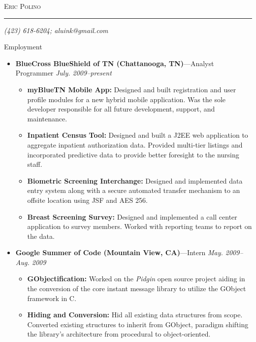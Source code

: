 \documentclass[11pt,oneside]{article}
\makeatletter
\newcommand{\name}{Eric Polino}
\newcommand{\phone}{(423) 618-6204}
\newcommand{\email}{aluink@gmail.com}
\newcommand{\bigname}[1]{
	\begin{center}\fontfamily{phv}\selectfont\Huge\scshape#1\end{center}
}
\newenvironment{ressection}[1]{
	\vspace{4pt}
	{\fontfamily{phv}\selectfont\Large#1}
	\begin{itemize}
	\vspace{3pt}
}{
	\end{itemize}
}
\newcommand{\ressubitem}[1]{
	\vspace{-1pt}
	\item \begin{flushleft} #1 \end{flushleft}
}
\newcommand{\resbigitem}[3]{
	\vspace{-5pt}
	\item
	{\textbf{#1}---#2 \hfill \textit{#3}}
}
\newenvironment{restitledposition}[3]{
	\resbigitem{#1}{#2}{#3}
	\vspace{-2pt}
	\begin{itemize}
}{
	\end{itemize}
}
\makeatother
\begin{document}
 \selectfont

\bigname{\name}

\vspace{-8pt} \rule{\textwidth}{1pt}

\vspace{-1pt} {\small\itshape \hfill \phone; \email \hfill}

\vspace{8 pt}

\begin{ressection}{Employment}

	\begin{restitledposition}{BlueCross BlueShield of TN (Chattanooga, TN)}{Analyst
Programmer}{July. 2009--present}

    \ressubitem{\textbf{myBlueTN Mobile App:} Designed and built registration
    and user profile modules for a new hybrid mobile application. 
    Was the sole developer responsible for all future development, support, and 
    maintenance.}

		\ressubitem{\textbf{Inpatient Census Tool:} Designed and built a J2EE web 
    application to aggregate inpatient authorization data. Provided 
    multi-tier listings and incorporated predictive data to provide	better 
    foresight to the nursing staff.}
		
		\ressubitem{\textbf{Biometric Screening Interchange:} Designed and implemented
    data entry system along with a secure automated transfer mechanism to an
    offsite location using JSF and AES 256.}

		\ressubitem{\textbf{Breast Screening Survey:} Designed and implemented a call center application
		to survey members. Worked with reporting teams to report on the data.}

	\end{restitledposition}

	\begin{restitledposition}{Google Summer of Code (Mountain View, CA)}{Intern}{May. 2009--Aug. 2009}

		\ressubitem{\textbf{GObjectification:} Worked on the \textit{Pidgin} open source project
		aiding in the conversion of the core instant message library to utilize the 
		GObject framework in C.}

		\ressubitem{\textbf{Hiding and Conversion:} Hid all existing data structures from scope.
		Converted existing structures to inherit from GObject, paradigm shifting the library's 
		architecture from procedural to object-oriented.}
		

\end{restitledposition}
\end{ressection}
\end{document}

